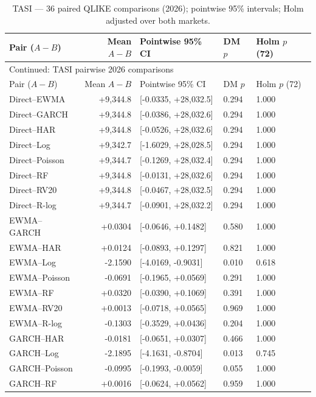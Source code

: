 \begin{longtable}{@{}lrlll@{}}
\caption{TASI --- 36 paired QLIKE comparisons (2026); pointwise 95\% intervals; Holm adjusted over both markets.}\label{tab:all-dm-expanded-tasi}\\
\toprule Pair ($A-B$) & Mean $A-B$ & Pointwise 95\% CI & DM $p$ & Holm $p$ (72)\\\midrule\endfirsthead
\multicolumn{5}{l}{\footnotesize Continued: TASI pairwise 2026 comparisons}\\\toprule
Pair ($A-B$) & Mean $A-B$ & Pointwise 95\% CI & DM $p$ & Holm $p$ (72)\\\midrule\endhead
Direct--EWMA & +9,344.8 & [-0.0335, +28,032.5] & 0.294 & 1.000 \\
Direct--GARCH & +9,344.8 & [-0.0386, +28,032.6] & 0.294 & 1.000 \\
Direct--HAR & +9,344.8 & [-0.0526, +28,032.6] & 0.294 & 1.000 \\
Direct--Log & +9,342.7 & [-1.6029, +28,028.5] & 0.294 & 1.000 \\
Direct--Poisson & +9,344.7 & [-0.1269, +28,032.4] & 0.294 & 1.000 \\
Direct--RF & +9,344.8 & [-0.0131, +28,032.6] & 0.294 & 1.000 \\
Direct--RV20 & +9,344.8 & [-0.0467, +28,032.5] & 0.294 & 1.000 \\
Direct--R-log & +9,344.7 & [-0.0901, +28,032.2] & 0.294 & 1.000 \\
EWMA--GARCH & +0.0304 & [-0.0646, +0.1482] & 0.580 & 1.000 \\
EWMA--HAR & +0.0124 & [-0.0893, +0.1297] & 0.821 & 1.000 \\
EWMA--Log & -2.1590 & [-4.0169, -0.9031] & 0.010 & 0.618 \\
EWMA--Poisson & -0.0691 & [-0.1965, +0.0569] & 0.291 & 1.000 \\
EWMA--RF & +0.0320 & [-0.0390, +0.1069] & 0.391 & 1.000 \\
EWMA--RV20 & +0.0013 & [-0.0718, +0.0565] & 0.969 & 1.000 \\
EWMA--R-log & -0.1303 & [-0.3529, +0.0436] & 0.204 & 1.000 \\
GARCH--HAR & -0.0181 & [-0.0651, +0.0307] & 0.466 & 1.000 \\
GARCH--Log & -2.1895 & [-4.1631, -0.8704] & 0.013 & 0.745 \\
GARCH--Poisson & -0.0995 & [-0.1993, -0.0059] & 0.055 & 1.000 \\
GARCH--RF & +0.0016 & [-0.0624, +0.0562] & 0.959 & 1.000 \\

\end{longtable}
